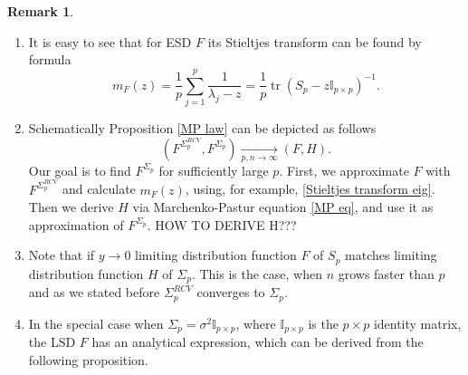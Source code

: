 \documentclass[a4paper,11pt]{book}
\theoremstyle{plain}
\theoremstyle{definition}
\newtheorem{rmrk}[thm]{Remark}
\newcommand{\tr}{\operatorname{tr}}
\begin{document}
	\begin{rmrk} \
		\begin{enumerate}
			\item It is easy to see that for ESD $F$ its Stieltjes transform can be found by formula
			\begin{equation} \label{Stieltjes transform eig}
			m_F(z) = \frac{1}{p} \sum_{j=1}^p \frac{1}{\lambda_j - z} = \frac{1}{p} \tr(S_p-z\mathbb{I}_{p \times p})^{-1} .
			\end{equation}
			\item Schematically Proposition \ref{MP law} can be depicted as follows
			\[(F^{\Sigma_p^{RCV}}, F^{\Sigma_p}) \xrightarrow[p,n \rightarrow \infty]{} (F, H).\]
			Our goal is to find $F^{\Sigma_p}$ for sufficiently large $p$. First, we approximate $F$ with $F^{\Sigma_p^{RCV}}$ and calculate $m_F(z)$, using, for example, \eqref{Stieltjes transform eig}. Then we derive $H$ via Marchenko-Pastur equation \eqref{MP eq}, and use it as approximation of $F^{\Sigma_p}$. HOW TO DERIVE H???
			\item Note that if $y \rightarrow 0$ limiting distribution function $F$ of $S_p$ matches limiting distribution function $H$ of $\Sigma_p$. This is the case, when $n$ grows faster than $p$ and as we stated before $\Sigma_p^{RCV}$ converges to $\Sigma_p$.
			\item In the special case when $\Sigma_p = \sigma^2 \mathbb{I}_{p \times p}$, where $\mathbb{I}_{p \times p}$ is the $p \times p$ identity matrix, the LSD $F$ has an analytical expression, which can be derived from the following proposition.
		\end{enumerate}
	\end{rmrk}
	
\end{document}

